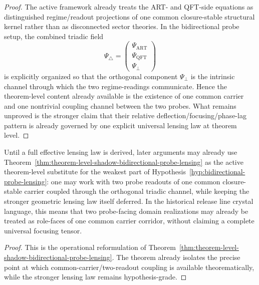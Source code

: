 \begin{proof}
The active framework already treats the ART- and QFT-side equations as distinguished regime/readout projections of one common closure-stable structural kernel rather than as disconnected sector theories. In the bidirectional probe setup, the combined triadic field
\[
 \Psi_{\triangle}
 =
 \begin{pmatrix}
 \Psi_{\mathrm{ART}}\\
 \Psi_{\mathrm{QFT}}\\
 \Psi_\perp
 \end{pmatrix}
\]
is explicitly organized so that the orthogonal component $\Psi_\perp$ is the intrinsic channel through which the two regime-readings communicate. Hence the theorem-level content already available is the existence of one common carrier and one nontrivial coupling channel between the two probes. What remains unproved is the stronger claim that their relative deflection/focusing/phase-lag pattern is already governed by one explicit universal lensing law at theorem level.
\end{proof}

\begin{corollary}
\label{cor:operational-reading-bidirectional-probe-lensing-v320}
Until a full effective lensing law is derived, later arguments may already use Theorem~\ref{thm:theorem-level-shadow-bidirectional-probe-lensing} as the active theorem-level substitute for the weakest part of Hypothesis~\ref{hyp:bidirectional-probe-lensing}: one may work with two probe readouts of one common closure-stable carrier coupled through the orthogonal triadic channel, while keeping the stronger geometric lensing law itself deferred. In the historical release line crystal language, this means that two probe-facing domain realizations may already be treated as role-faces of one common carrier corridor, without claiming a complete universal focusing tensor.
\end{corollary}

\begin{proof}
This is the operational reformulation of Theorem~\ref{thm:theorem-level-shadow-bidirectional-probe-lensing}. The theorem already isolates the precise point at which common-carrier/two-readout coupling is available theorematically, while the stronger lensing law remains hypothesis-grade.
\end{proof}

